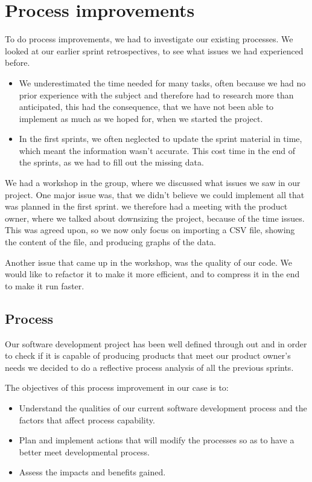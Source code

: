 \section{Process improvements} %
\label{sec:improvements}
To do process improvements, we had to investigate our existing processes. We looked at our earlier sprint retrospectives, to see what issues we had experienced before.
\begin{itemize}
	\item We underestimated the time needed for many tasks, often because we had no prior experience with the subject and therefore had to research more than anticipated, this had the consequence, that we have not been able to implement as much as we hoped for, when we started the project.
	\item In the first sprints, we often neglected to update the sprint material in time, which meant the information wasn't accurate. This cost time in the end of the sprints, as we had to fill out the missing data.
\end{itemize}

We had a workshop in the group, where we discussed what issues we saw in our project. One major issue was, that we didn't believe we could implement all that was planned in the first sprint.
we therefore had a meeting with the product owner, where we talked about downsizing the project, because of the time issues. This was agreed upon, so we now only focus on importing a CSV file, showing the content of the file, and producing graphs of the data.

Another issue that came up in the workshop, was the quality of our code. We would like to refactor it to make it more efficient, and to compress it in the end to make it run faster.
\subsection{Process} %
\label{sec:Process}

Our software development project has been well defined through out and in order to check if it is capable of producing products that meet our product owner's needs we decided to do a reflective process analysis of all the previous sprints.

The objectives of this process improvement in our case is to:

\begin{itemize}
	\item Understand the qualities of our current software development process and the factors that affect process capability.
	\item Plan and implement actions that will modify the processes so as to have a better meet developmental process.
	\item Assess the impacts and benefits gained.
\end{itemize}

